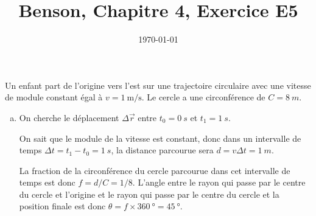 \documentclass{tufte-handout}
\title{Benson, Chapitre 4, Exercice E5}
\author{}
\date{\today}
\begin{document}
\maketitle

Un enfant part de l'origine vers l'est sur une trajectoire circulaire avec une
vitesse de module constant égal à $v = \SI{1}{\meter\per\second}$.  Le
cercle a une circonférence de $C = \SI{8}{m}$.

\begin{enumerate}[a)]
  \item On cherche le déplacement $\Delta \vec{r}$ entre $t_0 = \SI{0}{s}$ et
    $t_1 = \SI{1}{s}$.

    On sait que le module de la vitesse est constant, donc dans un intervalle
    de temps $\Delta t = t_1 - t_0 = \SI{1}{s}$, la distance parcourue sera
    $d = v\Delta t = \SI{1}{m}$.

    La fraction de la circonférence du cercle parcourue dans cet intervalle de
    temps est donc $f = d/C = 1/8$.  L'angle entre le rayon qui passe par le
    centre du cercle et l'origine et le rayon qui passe par le centre du cercle
    et la position finale est donc $\theta = f \times \SI{360}{\degree} =
    \SI{45}{\degree}$.
    \begin{marginfigure}
    \end{marginfigure}


\end{enumerate}
\end{document}
